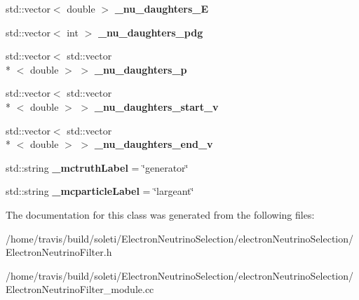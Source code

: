 \begin{DoxyCompactItemize}
\item 
\hypertarget{classlee_1_1ElectronNeutrinoFilter_aae9f16e2d7a07b5e9b6f1ad4a0d498ab}{std\-::vector$<$ double $>$ {\bfseries \-\_\-nu\-\_\-daughters\-\_\-\-E}}\label{classlee_1_1ElectronNeutrinoFilter_aae9f16e2d7a07b5e9b6f1ad4a0d498ab}

\item 
\hypertarget{classlee_1_1ElectronNeutrinoFilter_aa8618e4d9a89d2a11a6a0e2f2587ee0b}{std\-::vector$<$ int $>$ {\bfseries \-\_\-nu\-\_\-daughters\-\_\-pdg}}\label{classlee_1_1ElectronNeutrinoFilter_aa8618e4d9a89d2a11a6a0e2f2587ee0b}

\item 
\hypertarget{classlee_1_1ElectronNeutrinoFilter_adadc9f67a7081c711beb31212f756c7e}{std\-::vector$<$ std\-::vector\\*
$<$ double $>$ $>$ {\bfseries \-\_\-nu\-\_\-daughters\-\_\-p}}\label{classlee_1_1ElectronNeutrinoFilter_adadc9f67a7081c711beb31212f756c7e}

\item 
\hypertarget{classlee_1_1ElectronNeutrinoFilter_a7abfee2964d910a5caf074bc53389453}{std\-::vector$<$ std\-::vector\\*
$<$ double $>$ $>$ {\bfseries \-\_\-nu\-\_\-daughters\-\_\-start\-\_\-v}}\label{classlee_1_1ElectronNeutrinoFilter_a7abfee2964d910a5caf074bc53389453}

\item 
\hypertarget{classlee_1_1ElectronNeutrinoFilter_a7877ffa0e396de6907ed7dca3e5c5e1d}{std\-::vector$<$ std\-::vector\\*
$<$ double $>$ $>$ {\bfseries \-\_\-nu\-\_\-daughters\-\_\-end\-\_\-v}}\label{classlee_1_1ElectronNeutrinoFilter_a7877ffa0e396de6907ed7dca3e5c5e1d}

\item 
\hypertarget{classlee_1_1ElectronNeutrinoFilter_a7b91ab5f148464be875c2eb4438d091c}{std\-::string {\bfseries \-\_\-mctruth\-Label} = \char`\"{}generator\char`\"{}}\label{classlee_1_1ElectronNeutrinoFilter_a7b91ab5f148464be875c2eb4438d091c}

\item 
\hypertarget{classlee_1_1ElectronNeutrinoFilter_af903bbd240a90b34caeb1eddf5313642}{std\-::string {\bfseries \-\_\-mcparticle\-Label} = \char`\"{}largeant\char`\"{}}\label{classlee_1_1ElectronNeutrinoFilter_af903bbd240a90b34caeb1eddf5313642}

\end{DoxyCompactItemize}


The documentation for this class was generated from the following files\-:\begin{DoxyCompactItemize}
\item 
/home/travis/build/soleti/\-Electron\-Neutrino\-Selection/electron\-Neutrino\-Selection/Electron\-Neutrino\-Filter.\-h\item 
/home/travis/build/soleti/\-Electron\-Neutrino\-Selection/electron\-Neutrino\-Selection/Electron\-Neutrino\-Filter\-\_\-module.\-cc\end{DoxyCompactItemize}
